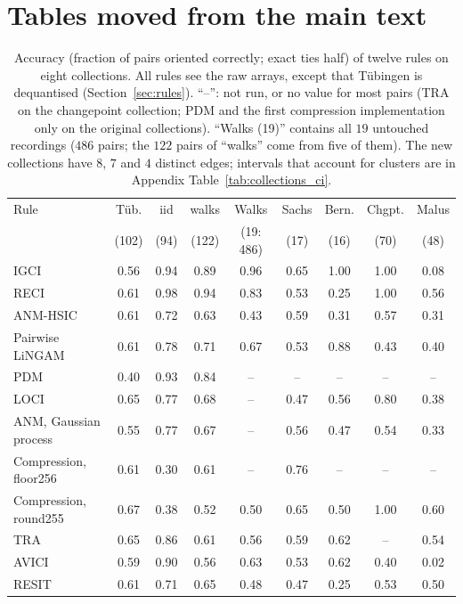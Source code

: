 \section{Tables moved from the main text}
\begin{table}[ht]
\caption{Accuracy (fraction of pairs oriented correctly; exact ties half) of twelve rules on eight collections. All rules see the raw arrays, except that T\"ubingen is dequantised (Section~\ref{sec:rules}). ``--'': not run, or no value for most pairs (TRA on the changepoint collection; PDM and the first compression implementation only on the original collections). ``Walks (19)'' contains all $19$ untouched recordings ($486$ pairs; the $122$ pairs of ``walks'' come from five of them). The new collections have $8$, $7$ and $4$ distinct edges; intervals that account for clusters are in Appendix Table~\ref{tab:collections_ci}.}
\label{tab:collections2}
\small
\setlength{\tabcolsep}{3.2pt}
\begin{tabular}{@{}lcccccccc@{}}
\toprule
Rule & T\"ub. & iid & walks & Walks & Sachs & Bern. & Chgpt. & Malus\\
 & (102) & (94) & (122) & (19: 486) & (17) & (16) & (70) & (48)\\
\midrule
IGCI & 0.56 & 0.94 & 0.89 & 0.96 & 0.65 & 1.00 & 1.00 & 0.08\\
RECI & 0.61 & 0.98 & 0.94 & 0.83 & 0.53 & 0.25 & 1.00 & 0.56\\
ANM-HSIC & 0.61 & 0.72 & 0.63 & 0.43 & 0.59 & 0.31 & 0.57 & 0.31\\
Pairwise LiNGAM & 0.61 & 0.78 & 0.71 & 0.67 & 0.53 & 0.88 & 0.43 & 0.40\\
PDM & 0.40 & 0.93 & 0.84 & -- & -- & -- & -- & --\\
LOCI & 0.65 & 0.77 & 0.68 & -- & 0.47 & 0.56 & 0.80 & 0.38\\
ANM, Gaussian process & 0.55 & 0.77 & 0.67 & -- & 0.56 & 0.47 & 0.54 & 0.33\\
Compression, floor256 & 0.61 & 0.30 & 0.61 & -- & 0.76 & -- & -- & --\\
Compression, round255 & 0.67 & 0.38 & 0.52 & 0.50 & 0.65 & 0.50 & 1.00 & 0.60\\
TRA & 0.65 & 0.86 & 0.61 & 0.56 & 0.59 & 0.62 & -- & 0.54\\
AVICI & 0.59 & 0.90 & 0.56 & 0.63 & 0.53 & 0.62 & 0.40 & 0.02\\
RESIT & 0.61 & 0.71 & 0.65 & 0.48 & 0.47 & 0.25 & 0.53 & 0.50\\
\bottomrule
\end{tabular}
\end{table}

